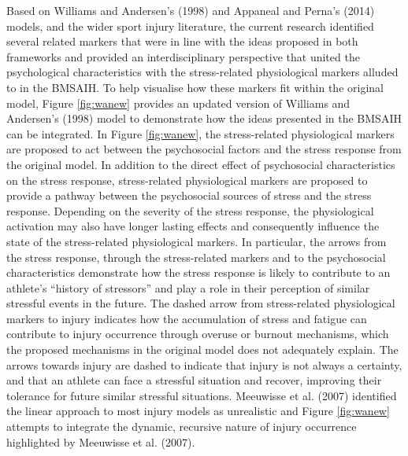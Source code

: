 \documentclass[man,floatsintext]{apa6}
\begin{document}
Based on Williams and Andersen's (1998) and Appaneal and Perna's (2014) models, and the wider sport injury literature, the current research identified several related markers that were in line with the ideas proposed in both frameworks and provided an interdisciplinary perspective that united the psychological characteristics with the stress-related physiological markers alluded to in the BMSAIH.
To help visualise how these markers fit within the original model, Figure \ref{fig:wanew} provides an updated version of Williams and Andersen's (1998) model to demonstrate how the ideas presented in the BMSAIH can be integrated.
In Figure \ref{fig:wanew}, the stress-related physiological markers are proposed to act between the psychosocial factors and the stress response from the original model.
In addition to the direct effect of psychosocial characteristics on the stress response, stress-related physiological markers are proposed to provide a pathway between the psychosocial sources of stress and the stress response.
Depending on the severity of the stress response, the physiological activation may also have longer lasting effects and consequently influence the state of the stress-related physiological markers.
In particular, the arrows from the stress response, through the stress-related markers and to the psychosocial characteristics demonstrate how the stress response is likely to contribute to an athlete's \enquote{history of stressors} and play a role in their perception of similar stressful events in the future.
The dashed arrow from stress-related physiological markers to injury indicates how the accumulation of stress and fatigue can contribute to injury occurrence through overuse or burnout mechanisms, which the proposed mechanisms in the original model does not adequately explain.
The arrows towards injury are dashed to indicate that injury is not always a certainty, and that an athlete can face a stressful situation and recover, improving their tolerance for future similar stressful situations.
Meeuwisse et al. (2007) identified the linear approach to most injury models as unrealistic and Figure \ref{fig:wanew} attempts to integrate the dynamic, recursive nature of injury occurrence highlighted by Meeuwisse et al. (2007).
\end{document}
